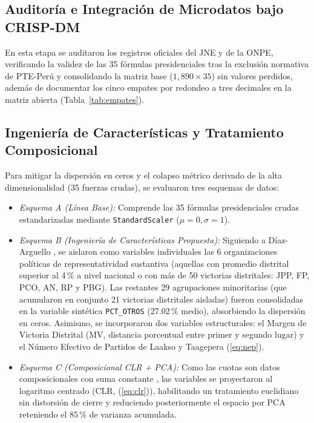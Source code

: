 \documentclass[conference,10pt,letterpaper]{IEEEtran}
\begin{document}
\subsection{Auditoría e Integración de Microdatos bajo CRISP-DM}

En esta etapa se auditaron los registros oficiales del JNE y de la ONPE, verificando la validez de las 35 fórmulas presidenciales tras la exclusión normativa de PTE-Perú y consolidando la matriz base ($1{,}890 \times 35$) sin valores perdidos, además de documentar los cinco empates por redondeo a tres decimales en la matriz abierta (Tabla~\ref{tab:empates}).

\subsection{Ingeniería de Características y Tratamiento Composicional}

Para mitigar la dispersión en ceros y el colapso métrico derivado de la alta dimensionalidad (35 fuerzas crudas), se evaluaron tres esquemas de datos:
\begin{itemize}
    \item \textit{Esquema A (Línea Base):} Comprende las 35 fórmulas presidenciales crudas estandarizadas mediante \texttt{StandardScaler} ($\mu = 0, \sigma = 1$).
    \item \textit{Esquema B (Ingeniería de Características Propuesta):} Siguiendo a Díaz-Arguello \cite{diaz2025}, se aislaron como variables individuales las 6 organizaciones políticas de representatividad sustantiva (aquellas con promedio distrital superior al 4\,\% a nivel nacional o con más de 50 victorias distritales: JPP, FP, PCO, AN, RP y PBG). Las restantes 29 agrupaciones minoritarias (que acumularon en conjunto 21 victorias distritales aisladas) fueron consolidadas en la variable sintética \texttt{PCT\_OTROS} (27.02\,\% medio), absorbiendo la dispersión en ceros. Asimismo, se incorporaron dos variables estructurales: el Margen de Victoria Distrital (MV, distancia porcentual entre primer y segundo lugar) y el Número Efectivo de Partidos de Laakso y Taagepera (\ref{eq:nep}).
    \item \textit{Esquema C (Composicional CLR + PCA):} Como las cuotas son datos composicionales con suma constante \cite{greenacre2021}, las variables se proyectaron al logaritmo centrado (CLR, (\ref{eq:clr})), habilitando un tratamiento euclidiano sin distorsión de cierre y reduciendo posteriormente el espacio por PCA reteniendo el 85\,\% de varianza acumulada.
\end{itemize}
\end{document}
